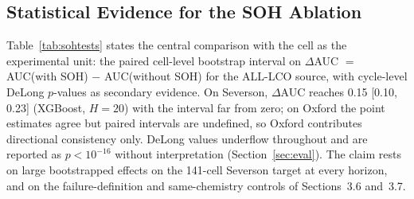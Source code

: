\documentclass[preprint,12pt]{elsarticle}
\begin{document}
\subsection{Statistical Evidence for the SOH Ablation}
Table~\ref{tab:sohtests} states the central comparison with the cell as the experimental unit: the paired cell-level bootstrap interval on $\Delta$AUC $=$ AUC(with SOH) $-$ AUC(without SOH) for the ALL-LCO source, with cycle-level DeLong $p$-values as secondary evidence. On Severson, $\Delta$AUC reaches 0.15 [0.10, 0.23] (XGBoost, $H{=}20$) with the interval far from zero; on Oxford the point estimates agree but paired intervals are undefined, so Oxford contributes directional consistency only. DeLong values underflow throughout and are reported as $p{<}10^{-16}$ without interpretation (Section~\ref{sec:eval}). The claim rests on large bootstrapped effects on the 141-cell Severson target at every horizon, and on the failure-definition and same-chemistry controls of Sections~3.6 and~3.7.
\end{document}
